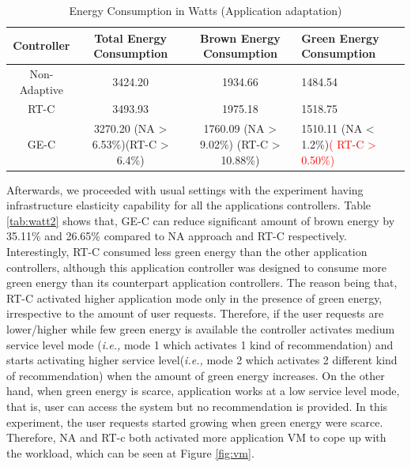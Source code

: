
\begin{table}
\caption{Energy Consumption in Watts (Application adaptation)}
  \label{tab:watt1}
\begin{tabular}{cccl}
\toprule
Controller & Total Energy Consumption & Brown Energy Consumption & Green Energy Consumption\\
\midrule
Non-Adaptive & 3424.20 & 1934.66 & 1484.54 \\
RT-C & 3493.93 & 1975.18 & 1518.75  \\  %
GE-C & 3270.20 (NA > 6.53\%)(RT-C > 6.4\%) & 1760.09 (NA > 9.02\%) (RT-C > 10.88\%) & 1510.11 (NA < 1.2\%)\textcolor{red}{( RT-C > 0.50\%)} \\
\bottomrule
\end{tabular}
\end{table}


Afterwards, we proceeded with usual settings with the experiment having infrastructure elasticity capability for all the applications controllers. Table \ref{tab:watt2} shows that, GE-C can reduce significant amount of brown energy by 35.11\% and 26.65\% compared to NA approach and RT-C respectively. Interestingly, RT-C consumed less green energy than the other application controllers, although this application controller was designed to consume more green energy than its counterpart application controllers. The reason being that, RT-C activated higher application mode  only in the presence of green energy, irrespective to the amount of user requests. Therefore, if the user requests are lower/higher while few green energy is available the controller activates medium service level mode (\emph{i.e.,} mode 1 which activates 1 kind of recommendation) and starts activating higher service level(\emph{i.e.,} mode 2 which activates 2 different kind of recommendation) when the amount of green energy increases. On the other hand, when green energy is scarce, application works at a low service level mode, that is, user can access the system but no recommendation is provided. In this experiment, the user requests started growing when green energy were scarce. Therefore, NA and RT-c both activated more application VM to cope up with the workload, which can be seen at Figure \ref{fig:vm}.



